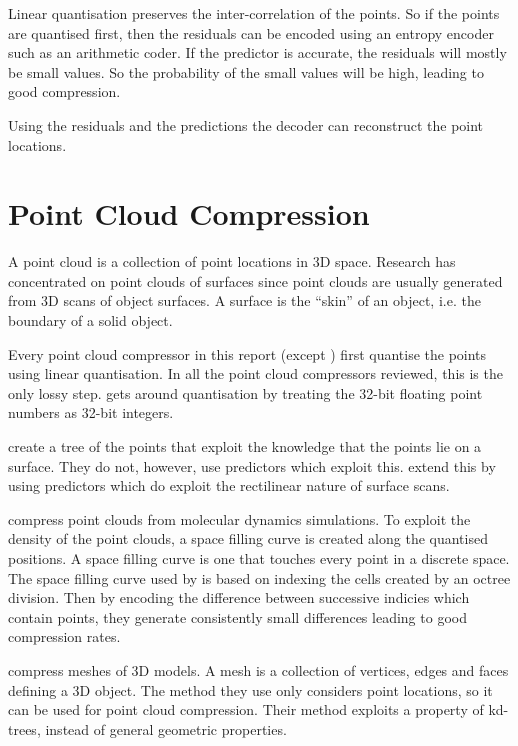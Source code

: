 \documentclass[a4paper]{report}
\begin{document}
Linear quantisation preserves the inter-correlation of the points. So if the
points are quantised first, then the residuals can be encoded using an entropy
encoder such as an arithmetic coder. If the predictor is accurate, the
residuals will mostly be small values. So the probability of the small values
will be high, leading to good compression.

Using the residuals and the predictions the decoder can reconstruct the point
locations.


\section{Point Cloud Compression}

A point cloud is a collection of point locations in 3D space. Research has
concentrated on point clouds of surfaces since point clouds are usually
generated from 3D scans of object surfaces. A surface is the ``skin'' of an
object, i.e. the boundary of a solid object.

Every point cloud compressor in this report (except \citet{chen2005lcp}) first
quantise the points using linear quantisation. In all the point cloud
compressors reviewed, this is the only lossy step. \citet{chen2005lcp} gets
around quantisation by treating the 32-bit floating point numbers as 32-bit
integers.

\citet{gumholdcomp} create a tree of the points that exploit the knowledge that
the points lie on a surface. They do not, however, use predictors which
exploit this. \citet{merrycomp} extend this by using predictors which do
exploit the rectilinear nature of surface scans.

\citet{omeltchenko2000sls} compress point clouds from molecular dynamics
simulations. To exploit the density of the point clouds, a space filling curve
is created along the quantised positions. A space filling curve is one that
touches every point in a discrete space. The space filling curve used by
\citet{omeltchenko2000sls} is based on indexing the cells created by an octree
division. Then by encoding the difference between successive indicies which
contain points, they generate consistently small differences leading to good
compression rates.

\citet{devillers2000gci} compress meshes of 3D models. A mesh is a collection
of vertices, edges and faces defining a 3D object. The method they use only
considers point locations, so it can be used for point cloud
compression. Their method exploits a property of kd-trees, instead of general
geometric properties.
\end{document}
